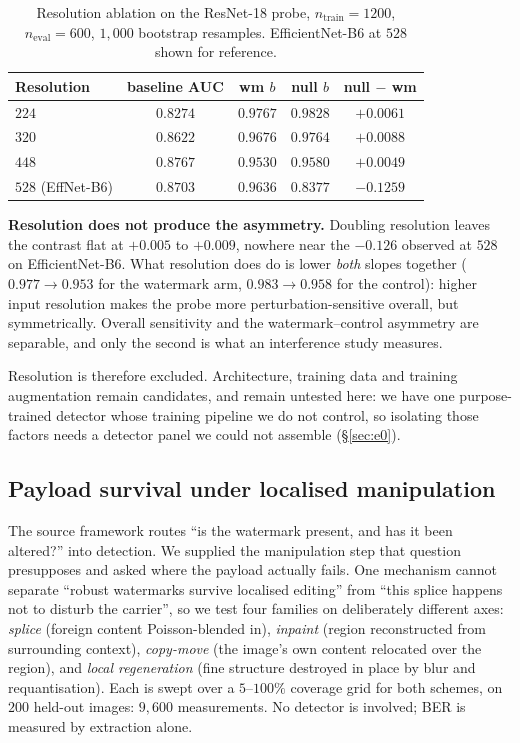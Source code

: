 \documentclass[journal]{IEEEtran}
\begin{document}
\begin{table}[t]
\centering
\caption{Resolution ablation on the ResNet-18 probe, $n_{\text{train}}{=}1200$,
$n_{\text{eval}}{=}600$, $1{,}000$ bootstrap resamples. EfficientNet-B6 at
$528$ shown for reference.}
\label{tab:resolution}
\footnotesize
\setlength{\tabcolsep}{3pt}
\begin{tabular}{lcccc}
\toprule
Resolution & baseline AUC & wm $b$ & null $b$ & null $-$ wm \\
\midrule
$224$ & $0.8274$ & $0.9767$ & $0.9828$ & $+0.0061$ \\
$320$ & $0.8622$ & $0.9676$ & $0.9764$ & $+0.0088$ \\
$448$ & $0.8767$ & $0.9530$ & $0.9580$ & $+0.0049$ \\
\midrule
$528$ (EffNet-B6) & $0.8703$ & $0.9636$ & $\mathbf{0.8377}$ & $\mathbf{-0.1259}$ \\
\bottomrule
\end{tabular}
\end{table}

\textbf{Resolution does not produce the asymmetry.} Doubling resolution leaves
the contrast flat at $+0.005$ to $+0.009$, nowhere near the $-0.126$ observed
at $528$ on EfficientNet-B6. What resolution does do is lower \emph{both}
slopes together ($0.977 \to 0.953$ for the watermark arm, $0.983 \to 0.958$
for the control): higher input resolution makes the probe more
perturbation-sensitive overall, but symmetrically. Overall sensitivity and the
watermark--control asymmetry are separable, and only the second is what an
interference study measures.

Resolution is therefore excluded. Architecture, training data and training
augmentation remain candidates, and remain untested here: we have one
purpose-trained detector whose training pipeline we do not control, so
isolating those factors needs a detector panel we could not assemble
(\S\ref{sec:e0}).

\subsection{Payload survival under localised manipulation}
\label{sec:provenance-inert}

The source framework routes ``is the watermark present, and has it been
altered?'' into detection. We supplied the manipulation step that question
presupposes and asked where the payload actually fails. One mechanism cannot
separate ``robust watermarks survive localised editing'' from ``this splice
happens not to disturb the carrier'', so we test four families on
deliberately different axes: \emph{splice} (foreign content Poisson-blended
in), \emph{inpaint} (region reconstructed from surrounding context),
\emph{copy-move} (the image's own content relocated over the region), and
\emph{local regeneration} (fine structure destroyed in place by blur and
requantisation). Each is swept over a $5$--$100\%$ coverage grid for both
schemes, on $200$ held-out images: $9{,}600$ measurements. No detector is
involved; BER is measured by extraction alone.
\end{document}
